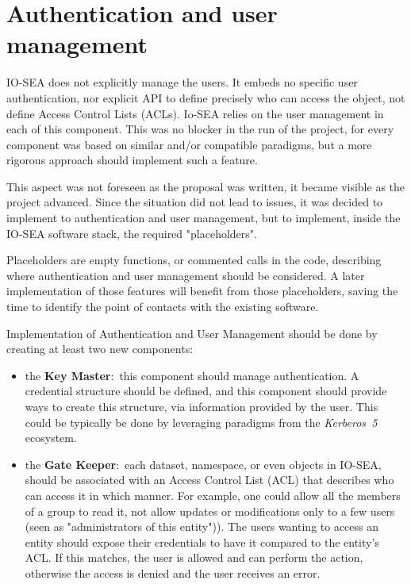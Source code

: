 \section{Authentication and user management}

IO-SEA does not explicitly manage the users. It embeds no specific user authentication, nor explicit API to 
define precisely who can access the object, not define Access Control Lists (ACLs). Io-SEA relies on the user
management in each of this component. This was no blocker in the run of the project, for every component was
based on similar and/or compatible paradigms, but a more rigorous approach should implement such a feature. 

This aspect was not foreseen as the proposal was written, it became visible as the project advanced. Since the 
situation did not lead to issues, it was decided to implement to authentication and user management, but to 
implement, inside the IO-SEA software stack, the required "placeholders".


Placeholders are empty functions, or commented calls in the code, describing where authentication and user 
management should be considered. A later implementation of those features will benefit from those placeholders, 
saving the time to identify the point of contacts with the existing software.

Implementation of Authentication and User Management should be done by creating at least two new components:
\begin{itemize}
    \item the \textbf{Key Master}:~this component should manage authentication. A credential structure should be
    defined, and this component should provide ways to create this structure, via information provided by the 
    user. This could be typically be done by leveraging paradigms from the \textit{Kerberos~5} ecosystem.
    
    \item the \textbf{Gate Keeper}:~each dataset, namespace, or even objects in IO-SEA, should be associated
    with an Access Control List (ACL) that describes who can access it in which manner. For example, one could
    allow all the members of a group to read it, not allow updates or modifications only to a few users (seen 
    as "administrators of this entity")). The users wanting to access an entity should expose their credentials
    to have it compared to the entity's ACL. If this matches, the user is allowed and can perform the action, 
    otherwise the access is denied and the user receives an error. 

\end{itemize}

